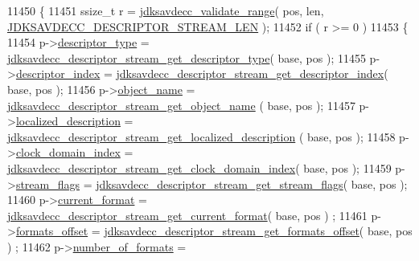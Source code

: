 \begin{DoxyCode}
11450 \{
11451     ssize\_t r = \hyperlink{group__util_ga9c02bdfe76c69163647c3196db7a73a1}{jdksavdecc\_validate\_range}( pos, len, 
      \hyperlink{group__descriptor__stream_gacaa7489d625d3c733ab8813b5fb7dbe5}{JDKSAVDECC\_DESCRIPTOR\_STREAM\_LEN} );
11452     \textcolor{keywordflow}{if} ( r >= 0 )
11453     \{
11454         p->\hyperlink{structjdksavdecc__descriptor__stream_ab7c32b6c7131c13d4ea3b7ee2f09b78d}{descriptor\_type} = 
      \hyperlink{group__descriptor__stream_gaea469ac868557638cd94d6ee32da8662}{jdksavdecc\_descriptor\_stream\_get\_descriptor\_type}( base, pos
       );
11455         p->\hyperlink{structjdksavdecc__descriptor__stream_a042bbc76d835b82d27c1932431ee38d4}{descriptor\_index} = 
      \hyperlink{group__descriptor__stream_ga7eb3ff210854a696a1cdd135facd81fb}{jdksavdecc\_descriptor\_stream\_get\_descriptor\_index}( base, 
      pos );
11456         p->\hyperlink{structjdksavdecc__descriptor__stream_a7d1f5945a13863b1762fc6db74fa8f80}{object\_name} = \hyperlink{group__descriptor__stream_ga7290ca27e5a9af5ace698b9c9cfb196d}{jdksavdecc\_descriptor\_stream\_get\_object\_name}
      ( base, pos );
11457         p->\hyperlink{structjdksavdecc__descriptor__stream_a0926f846ca65a83ad5bb06b4aff8f408}{localized\_description} = 
      \hyperlink{group__descriptor__stream_ga5a240a9d26b6dbb014df8eb5ffa3b6b0}{jdksavdecc\_descriptor\_stream\_get\_localized\_description}
      ( base, pos );
11458         p->\hyperlink{structjdksavdecc__descriptor__stream_a6608f023d147b556a49527d568abed8e}{clock\_domain\_index} = 
      \hyperlink{group__descriptor__stream_gaadf36d2aa34c9febbdd05326a0383dc7}{jdksavdecc\_descriptor\_stream\_get\_clock\_domain\_index}( 
      base, pos );
11459         p->\hyperlink{structjdksavdecc__descriptor__stream_ae7a5037df4d2baee5b2d23e8c1add96e}{stream\_flags} = 
      \hyperlink{group__descriptor__stream_gadf24dddf6aa85617cc44caf19a7df7c4}{jdksavdecc\_descriptor\_stream\_get\_stream\_flags}( base, pos );
11460         p->\hyperlink{structjdksavdecc__descriptor__stream_ae56fc78e7074485bad557163524904c7}{current\_format} = 
      \hyperlink{group__descriptor__stream_gab1dc69003050a52b74fa7cd9635e0528}{jdksavdecc\_descriptor\_stream\_get\_current\_format}( base, pos )
      ;
11461         p->\hyperlink{structjdksavdecc__descriptor__stream_a14de2c30220ecf623bb08204c1c90e61}{formats\_offset} = 
      \hyperlink{group__descriptor__stream_ga20a99e3ab9e02e92655a28e2ce5661c1}{jdksavdecc\_descriptor\_stream\_get\_formats\_offset}( base, pos )
      ;
11462         p->\hyperlink{structjdksavdecc__descriptor__stream_a94e1bc90e2d9a472f293ef6a68702001}{number\_of\_formats} = 

\end{DoxyCode}
